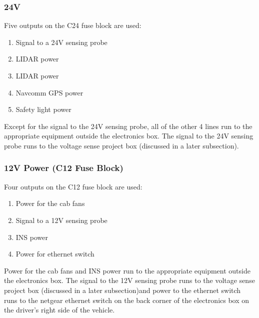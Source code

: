 \subsubsection{24V}
Five outputs on the C24 fuse block are used:
\begin{enumerate}
\item Signal to a 24V sensing probe
\item LIDAR power
\item LIDAR power
\item Navcomm GPS power
\item Safety light power
\end{enumerate}
%
Except for the signal to the 24V sensing probe, all of the other 4 lines run to the appropriate equipment outside the electronics box. The signal to the 24V sensing probe runs to the voltage sense project box (discussed in a later subsection).

\subsubsection{12V Power (C12 Fuse Block)}
Four outputs on the C12 fuse block are used:
\begin{enumerate}
\item Power for the cab fans
\item Signal to a 12V sensing probe
\item INS power
\item Power for ethernet switch
\end{enumerate}
%
Power for the cab fans and INS power run to the appropriate equipment outside the electronics box. The signal to the 12V sensing probe runs to the voltage sense project box (discussed in a later subsection)and power to the ethernet switch runs to the netgear ethernet switch on the back corner of the electronics box on the driver's right side of the vehicle.


